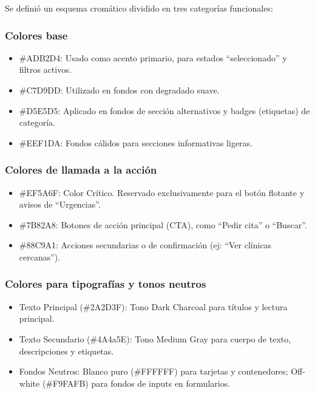 \documentclass[11pt]{article}
\begin{document}
Se definió un esquema cromático dividido en tres categorías funcionales:

\subsubsection{Colores base}

\begin{itemize}
\item \#ADB2D4: Usado como acento primario, para estados “seleccionado” y filtros activos.
\item \#C7D9DD: Utilizado en fondos con degradado suave.
\item \#D5E5D5: Aplicado en fondos de sección alternativos y badges (etiquetas) de categoría.
\item \#EEF1DA: Fondos cálidos para secciones informativas ligeras.
\end{itemize}

\subsubsection{Colores de llamada a la acción}

\begin{itemize}
\item \#EF5A6F: Color Crítico. Reservado exclusivamente para el botón flotante y avisos de “Urgencias”.
\item \#7B82A8: Botones de acción principal (CTA), como “Pedir cita” o “Buscar”.
\item \#88C9A1: Acciones secundarias o de confirmación (ej: “Ver clínicas cercanas”).
\end{itemize}

\subsubsection{Colores para tipografías y tonos neutros}

\begin{itemize}
\item Texto Principal (\#2A2D3F): Tono Dark Charcoal para títulos y lectura principal.
\item Texto Secundario (\#4A4a5E): Tono Medium Gray para cuerpo de texto, descripciones y etiquetas.
\item Fondos Neutros: Blanco puro (\#FFFFFF) para tarjetas y contenedores; Off-white (\#F9FAFB) para fondos de inputs en formularios.
\end{itemize}
\end{document}
